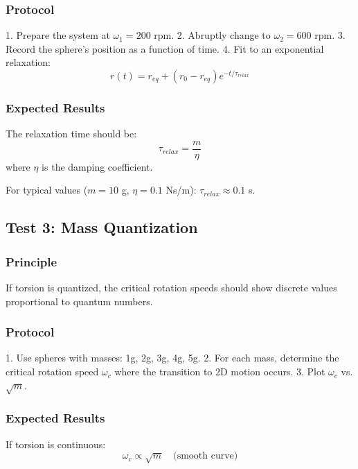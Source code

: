 \documentclass[UTF8]{ctex}\n\documentclass[12pt,a4paper]{article}
\begin{document}
\subsubsection{Protocol}

1. Prepare the system at $\omega_1 = 200$ rpm.
2. Abruptly change to $\omega_2 = 600$ rpm.
3. Record the sphere's position as a function of time.
4. Fit to an exponential relaxation:
\begin{equation}
    r(t) = r_{eq} + (r_0 - r_{eq})e^{-t/\tau_{relax}}
\end{equation}

\subsubsection{Expected Results}

The relaxation time should be:
\begin{equation}
    \tau_{relax} = \frac{m}{\eta}
\end{equation}
where $\eta$ is the damping coefficient.

For typical values ($m = 10$ g, $\eta = 0.1$ Ns/m): $\tau_{relax} \approx 0.1$ s.

\subsection{Test 3: Mass Quantization}

\subsubsection{Principle}

If torsion is quantized, the critical rotation speeds should show discrete values proportional to quantum numbers.

\subsubsection{Protocol}

1. Use spheres with masses: 1g, 2g, 3g, 4g, 5g.
2. For each mass, determine the critical rotation speed $\omega_c$ where the transition to 2D motion occurs.
3. Plot $\omega_c$ vs. $\sqrt{m}$.

\subsubsection{Expected Results}

If torsion is continuous:
\begin{equation}
    \omega_c \propto \sqrt{m} \quad \text{(smooth curve)}
\end{equation}
\end{document}
